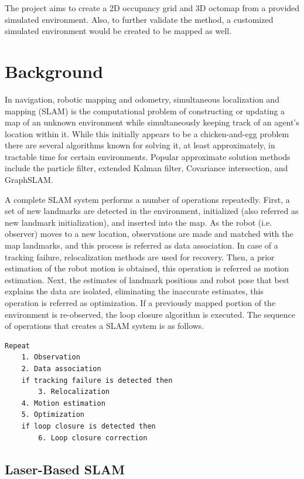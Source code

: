 \documentclass[10pt,journal,compsoc]{IEEEtran}
\begin{document}
The project aims to create a 2D occupancy grid and 3D octomap from a provided simulated environment. Also, to further validate the method, a customized simulated environment would be created to be mapped as well.

\section{Background}

In navigation, robotic mapping and odometry, simultaneous localization and mapping (SLAM) is the computational problem of constructing or updating a map of an unknown environment while simultaneously keeping track of an agent's location within it. While this initially appears to be a chicken-and-egg problem there are several algorithms known for solving it, at least approximately, in tractable time for certain environments. Popular approximate solution methods include the particle filter, extended Kalman filter, Covariance intersection, and GraphSLAM.

A complete SLAM system performs a number of operations repeatedly. First, a set of new landmarks are detected in the environment, initialized (also referred as new landmark initialization), and inserted into the map. As the robot (i.e. observer) moves to a new location, observations are made and matched with the map landmarks, and this process is referred as data association. In case of a tracking failure, relocalization methods are used for recovery. Then, a prior estimation of the robot motion is obtained, this operation is referred as motion estimation. Next, the estimates of landmark positions and robot pose that best explains the data are isolated, eliminating the inaccurate estimates, this operation is referred as optimization. If a previously mapped portion of the environment is re-observed, the loop closure algorithm is executed. The sequence of operations that creates a SLAM system is as follows.

\begin{lstlisting}
Repeat
    1. Observation
    2. Data association
    if tracking failure is detected then
        3. Relocalization
    4. Motion estimation
    5. Optimization
    if loop closure is detected then
        6. Loop closure correction
\end{lstlisting}

\subsection{Laser-Based SLAM}
\end{document}
